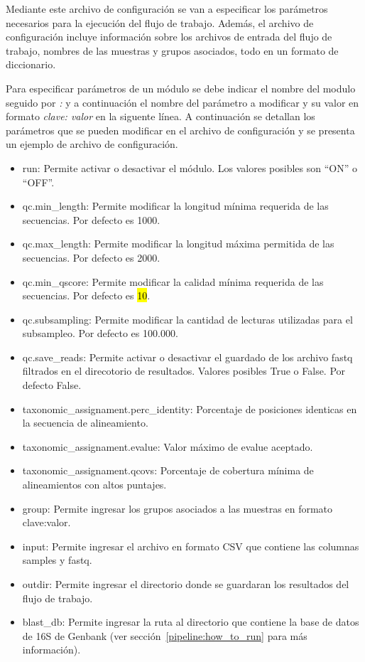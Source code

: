 Mediante este archivo de configuración se van a especificar los parámetros necesarios para la ejecución del flujo de trabajo.
Además, el archivo de configuración incluye información sobre los archivos de entrada del flujo de trabajo, nombres de las muestras y grupos asociados, todo en un formato de diccionario.

Para especificar parámetros de un módulo se debe indicar el nombre del modulo seguido por \textit{:} y a continuación el nombre del parámetro a modificar y su valor en formato \textit{clave: valor} en la siguente línea.
A continuación se detallan los parámetros que se pueden modificar en el archivo de configuración y se presenta un ejemplo de archivo de configuración.%
\begin{itemize}
    \item run: Permite activar o desactivar el módulo. Los valores posibles son ``ON'' o ``OFF''. 
    \item qc.min\_length: Permite modificar la longitud mínima requerida de las secuencias. Por defecto es 1000.
    \item qc.max\_length: Permite modificar la longitud máxima permitida de las secuencias. Por defecto es 2000.
    \item qc.min\_qscore: Permite modificar la calidad mínima requerida de las secuencias. Por defecto es \hl{10}.
    \item qc.subsampling: Permite modificar la cantidad de lecturas utilizadas para el subsampleo. Por defecto es 100.000.
    \item qc.save\_reads: Permite activar o desactivar el guardado de los archivo fastq filtrados en el direcotorio de resultados. Valores posibles True o False. Por defecto False. 
    \item taxonomic\_assignament.perc\_identity: Porcentaje de posiciones identicas en la secuencia de alineamiento.
    \item taxonomic\_assignament.evalue: Valor máximo de evalue aceptado.
    \item taxonomic\_assignament.qcovs: Porcentaje de cobertura mínima de alineamientos con altos puntajes.
    \item group: Permite ingresar los grupos asociados a las muestras en formato clave:valor.
    \item input: Permite ingresar el archivo en formato CSV que contiene las columnas samples y fastq.
    \item outdir: Permite ingresar el directorio donde se guardaran los resultados del flujo de trabajo.
    \item blast\_db: Permite ingresar la ruta al directorio que contiene la base de datos de 16S de Genbank (ver sección~\ref{pipeline:how_to_run} para más información).
\end{itemize}

